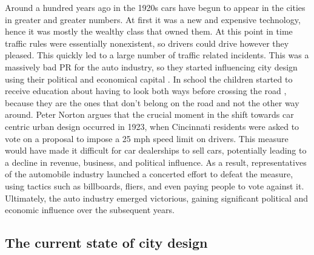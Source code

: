 \documentclass[
]{elteikthesis}[2023/04/10]
\begin{document}
Around a hundred years ago in the 1920s cars have begun to appear
in the cities in greater and greater numbers. At first it was a new
and expensive technology, hence it was mostly the wealthy class that
owned them. At this point in time traffic rules were essentially nonexistent,
so drivers could drive however they pleased. This quickly led to a
large number of traffic related incidents. This was a massively bad
PR for the auto industry, so they started influencing city design
using their political and economical capital \cite{marshall1996injuries}.
In school the children started to receive education about having to
look both ways before crossing the road \cite{norton2011fighting},
because they are the ones that don't belong on the road and not the
other way around. Peter Norton argues \cite{norton2007street} that
the crucial moment in the shift towards car centric urban design occurred
in 1923, when Cincinnati residents were asked to vote on a proposal
to impose a 25 mph speed limit on drivers. This measure would have
made it difficult for car dealerships to sell cars, potentially leading
to a decline in revenue, business, and political influence. As a result,
representatives of the automobile industry launched a concerted effort
to defeat the measure, using tactics such as billboards, fliers, and
even paying people to vote against it. Ultimately, the auto industry
emerged victorious, gaining significant political and economic influence
over the subsequent years.

\subsection{The current state of city design}
\end{document}
